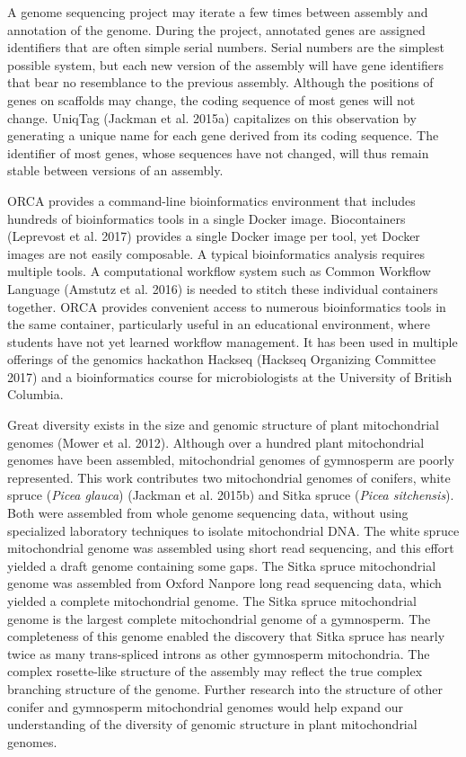\documentclass[
  12pt,
  oneside,
  openany]{book}
\begin{document}
A genome sequencing project may iterate a few times between assembly and annotation of the genome. During the project, annotated genes are assigned identifiers that are often simple serial numbers. Serial numbers are the simplest possible system, but each new version of the assembly will have gene identifiers that bear no resemblance to the previous assembly. Although the positions of genes on scaffolds may change, the coding sequence of most genes will not change. UniqTag (Jackman et al. 2015a) capitalizes on this observation by generating a unique name for each gene derived from its coding sequence. The identifier of most genes, whose sequences have not changed, will thus remain stable between versions of an assembly.

ORCA provides a command-line bioinformatics environment that includes hundreds of bioinformatics tools in a single Docker image. Biocontainers (Leprevost et al. 2017) provides a single Docker image per tool, yet Docker images are not easily composable. A typical bioinformatics analysis requires multiple tools. A computational workflow system such as Common Workflow Language (Amstutz et al. 2016) is needed to stitch these individual containers together. ORCA provides convenient access to numerous bioinformatics tools in the same container, particularly useful in an educational environment, where students have not yet learned workflow management. It has been used in multiple offerings of the genomics hackathon Hackseq (Hackseq Organizing Committee 2017) and a bioinformatics course for microbiologists at the University of British Columbia.

Great diversity exists in the size and genomic structure of plant mitochondrial genomes (Mower et al. 2012). Although over a hundred plant mitochondrial genomes have been assembled, mitochondrial genomes of gymnosperm are poorly represented. This work contributes two mitochondrial genomes of conifers, white spruce (\emph{Picea glauca}) (Jackman et al. 2015b) and Sitka spruce (\emph{Picea sitchensis}). Both were assembled from whole genome sequencing data, without using specialized laboratory techniques to isolate mitochondrial DNA. The white spruce mitochondrial genome was assembled using short read sequencing, and this effort yielded a draft genome containing some gaps. The Sitka spruce mitochondrial genome was assembled from Oxford Nanpore long read sequencing data, which yielded a complete mitochondrial genome. The Sitka spruce mitochondrial genome is the largest complete mitochondrial genome of a gymnosperm. The completeness of this genome enabled the discovery that Sitka spruce has nearly twice as many trans-spliced introns as other gymnosperm mitochondria. The complex rosette-like structure of the assembly may reflect the true complex branching structure of the genome. Further research into the structure of other conifer and gymnosperm mitochondrial genomes would help expand our understanding of the diversity of genomic structure in plant mitochondrial genomes.
\end{document}
